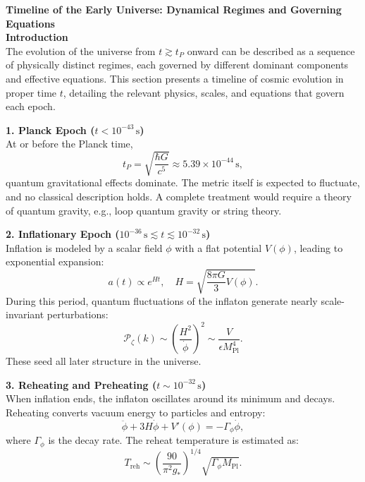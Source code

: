 \begin{technical}
{\Large\textbf{Timeline of the Early Universe: Dynamical Regimes and Governing Equations}}\\[0.7em]

\noindent\textbf{Introduction}\\[0.5em]
The evolution of the universe from \( t \gtrsim t_P \) onward can be described as a sequence of physically distinct regimes, each governed by different dominant components and effective equations. This section presents a timeline of cosmic evolution in proper time \( t \), detailing the relevant physics, scales, and equations that govern each epoch.

\noindent\textbf{1. Planck Epoch \boldmath(\( t < 10^{-43} \, \text{s} \))}\\[0.5em]
At or before the Planck time,
\[
t_P = \sqrt{\frac{\hbar G}{c^5}} \approx 5.39 \times 10^{-44} \, \text{s},
\]
quantum gravitational effects dominate. The metric itself is expected to fluctuate, and no classical description holds. A complete treatment would require a theory of quantum gravity, e.g., loop quantum gravity or string theory.

\noindent\textbf{2. Inflationary Epoch \boldmath(\(10^{-36} \, \text{s} \lesssim t \lesssim 10^{-32} \, \text{s} \))}\\[0.5em]
Inflation is modeled by a scalar field \(\phi\) with a flat potential \(V(\phi)\), leading to exponential expansion:
\[
a(t) \propto e^{H t}, \quad H = \sqrt{\frac{8\pi G}{3} V(\phi)}.
\]
During this period, quantum fluctuations of the inflaton generate nearly scale-invariant perturbations:
\[
\mathcal{P}_\zeta(k) \sim \left( \frac{H^2}{\dot{\phi}} \right)^2 \sim \frac{V}{\epsilon M_{\text{Pl}}^4}.
\]
These seed all later structure in the universe.

\noindent\textbf{3. Reheating and Preheating \boldmath(\( t \sim 10^{-32} \, \text{s} \))}\\[0.5em]
When inflation ends, the inflaton oscillates around its minimum and decays. Reheating converts vacuum energy to particles and entropy:
\[
\ddot{\phi} + 3H\dot{\phi} + V'(\phi) = -\Gamma_\phi \dot{\phi},
\]
where \(\Gamma_\phi\) is the decay rate. The reheat temperature is estimated as:
\[
T_{\text{reh}} \sim \left( \frac{90}{\pi^2 g_*} \right)^{1/4} \sqrt{\Gamma_\phi M_{\text{Pl}}}.
\]


\end{technical}
